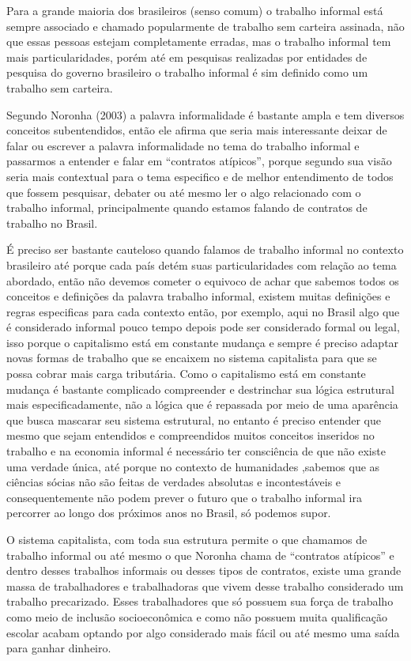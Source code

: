 Para a grande maioria dos brasileiros (senso comum) o trabalho informal está sempre associado e chamado 
popularmente de trabalho sem carteira assinada, não que essas pessoas estejam completamente erradas, 
mas o trabalho informal tem mais particularidades, porém até em pesquisas realizadas por entidades de 
pesquisa do governo brasileiro o trabalho informal é sim definido como um trabalho sem carteira.

Segundo Noronha (2003) a palavra informalidade é bastante ampla e tem diversos conceitos subentendidos, 
então ele afirma que seria mais interessante deixar de falar ou escrever a palavra informalidade no 
tema do trabalho informal e passarmos a entender e falar em “contratos atípicos”, porque segundo sua 
visão seria mais contextual para o tema especifico e de melhor entendimento de todos que fossem 
pesquisar, debater ou até mesmo ler o algo relacionado com o trabalho informal, principalmente quando 
estamos falando de contratos de trabalho no Brasil.

É preciso ser bastante cauteloso quando falamos de trabalho informal no contexto brasileiro até porque 
cada país detém suas particularidades com relação ao tema abordado, então não devemos cometer o equivoco 
de achar que sabemos todos os conceitos e definições da palavra trabalho informal, existem muitas definições 
e regras especificas para cada contexto então, por exemplo, aqui no Brasil algo que é considerado informal 
pouco tempo depois pode ser considerado formal ou legal, isso porque o capitalismo está em constante mudança 
e sempre é preciso adaptar novas formas de trabalho que se encaixem no sistema capitalista para que se possa 
cobrar mais carga tributária. Como o capitalismo está em constante mudança é bastante complicado compreender 
e destrinchar sua lógica estrutural mais especificadamente, não a lógica que é repassada por meio de uma 
aparência que busca mascarar seu sistema estrutural, no entanto é preciso entender que mesmo que sejam entendidos 
e compreendidos muitos conceitos inseridos no trabalho e na economia informal é necessário ter consciência de 
que não existe uma verdade única, até porque no contexto de humanidades ,sabemos que as ciências sócias não
são feitas de verdades absolutas e incontestáveis e consequentemente não podem prever o futuro que o trabalho 
informal ira percorrer ao longo dos próximos anos no Brasil, só podemos supor.

O sistema capitalista, com toda sua estrutura permite o que chamamos de trabalho informal ou até mesmo o que 
Noronha chama de “contratos atípicos” e dentro desses trabalhos informais ou desses tipos de contratos, existe 
uma grande massa de trabalhadores e trabalhadoras que vivem desse trabalho considerado um trabalho precarizado. 
Esses trabalhadores que só possuem sua força de trabalho como meio de inclusão socioeconômica e como não possuem
muita qualificação escolar acabam optando por algo considerado mais fácil ou até mesmo uma saída para ganhar dinheiro. 

